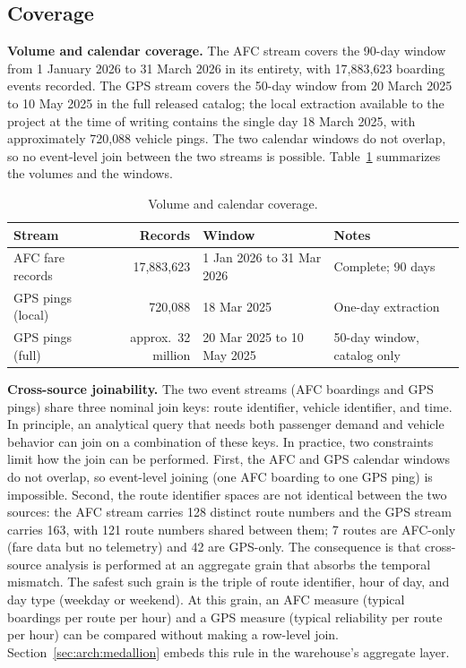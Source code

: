 \subsection{Coverage}
\label{sec:solution:dataset:coverage}

\noindent\textbf{Volume and calendar coverage.} The AFC stream covers the
90-day window from 1 January 2026 to 31 March 2026 in its entirety, with
17{,}883{,}623 boarding events recorded. The GPS stream covers the 50-day
window from 20 March 2025 to 10 May 2025 in the full released catalog;
the local extraction available to the project at the time of writing
contains the single day 18 March 2025, with approximately 720{,}088 vehicle
pings. The two calendar windows do not overlap, so no event-level join
between the two streams is possible.
Table~\ref{tab:dataset:volume} summarizes the volumes and the windows.

\begin{table}[!htbp]
  \centering
  \caption{Volume and calendar coverage.}
  \label{tab:dataset:volume}
  \footnotesize
  \renewcommand{\arraystretch}{1.20}
  \begin{tabularx}{\linewidth}{p{3.6cm} r p{4.4cm} X}
    \hline
    \textbf{Stream}    & \textbf{Records} & \textbf{Window} & \textbf{Notes} \\
    \hline
    AFC fare records   & 17{,}883{,}623     & 1 Jan 2026 to 31 Mar 2026  & Complete; 90 days \\
    GPS pings (local)  & 720{,}088          & 18 Mar 2025                & One-day extraction \\
    GPS pings (full)   & approx.\ 32 million & 20 Mar 2025 to 10 May 2025 & 50-day window, catalog only \\
    \hline
  \end{tabularx}
\end{table}

\noindent\textbf{Cross-source joinability.} The two event streams (AFC
boardings and GPS pings) share three nominal join keys: route identifier,
vehicle identifier, and time. In principle, an analytical query that needs
both passenger demand and vehicle behavior can join on a combination of
these keys. In practice, two constraints limit how the join can be
performed. First, the AFC and GPS calendar windows do not overlap, so
event-level joining (one AFC boarding to one GPS ping) is impossible.
Second, the route identifier spaces are not identical between the two
sources: the AFC stream carries 128 distinct route numbers and the GPS
stream carries 163, with 121 route numbers shared between them; 7 routes
are AFC-only (fare data but no telemetry) and 42 are GPS-only. The
consequence is that cross-source analysis is
performed at an aggregate grain that absorbs the temporal mismatch. The
safest such grain is the triple of route identifier, hour of day, and day
type (weekday or weekend). At this grain, an AFC measure (typical
boardings per route per hour) and a GPS measure (typical reliability per
route per hour) can be compared without making a row-level join.
Section~\ref{sec:arch:medallion} embeds this rule in the
warehouse's aggregate layer.

